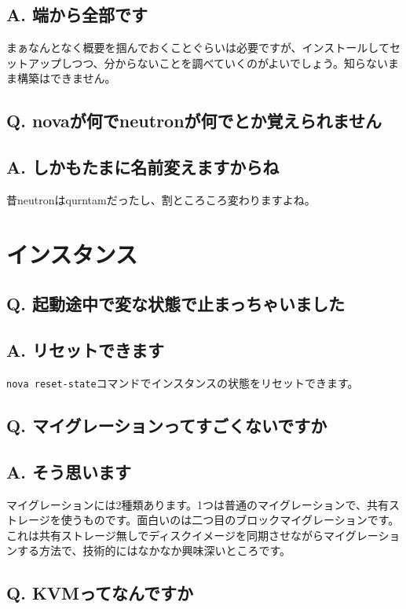 \documentclass[9pt,b5paper,tombo,openany]{jsbook}
\begin{document}
\subsection*{{\LARGE\bfseries A.} 端から全部です}
まぁなんとなく概要を掴んでおくことぐらいは必要ですが、インストールしてセットアップしつつ、分からないことを調べていくのがよいでしょう。知らないまま構築はできません。

\subsection*{{\LARGE\bfseries Q.} novaが何でneutronが何でとか覚えられません}
\subsection*{{\LARGE\bfseries A.} しかもたまに名前変えますからね}
昔neutronはqurntamだったし、割ところころ変わりますよね。

\section{インスタンス}

\subsection*{{\LARGE\bfseries Q.} 起動途中で変な状態で止まっちゃいました}
\subsection*{{\LARGE\bfseries A.} リセットできます}
\verb|nova reset-state|コマンドでインスタンスの状態をリセットできます。

\subsection*{{\LARGE\bfseries Q.} マイグレーションってすごくないですか}
\subsection*{{\LARGE\bfseries A.} そう思います}
マイグレーションには2種類あります。1つは普通のマイグレーションで、共有ストレージを使うものです。面白いのは二つ目のブロックマイグレーションです。これは共有ストレージ無しでディスクイメージを同期させながらマイグレーションする方法で、技術的にはなかなか興味深いところです。

\subsection*{{\LARGE\bfseries Q.} KVMってなんですか}
\end{document}
